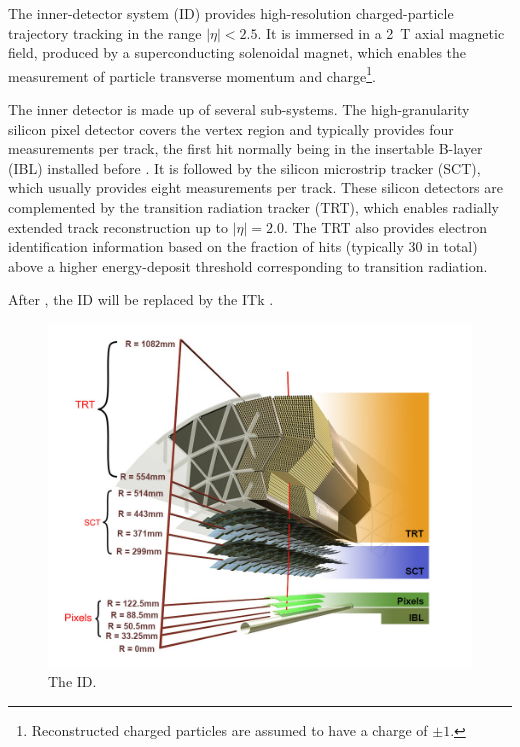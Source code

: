 The inner-detector system (ID) provides high-resolution charged-particle trajectory tracking in the range $|\eta| < 2.5$.
It is immersed in a \SI{2}{\tesla} axial magnetic field, produced by a superconducting solenoidal magnet, which enables the measurement of particle transverse momentum and charge\footnote{Reconstructed charged particles are assumed to have a charge of $\pm 1$.}.

The inner detector is made up of several sub-systems.
The high-granularity silicon pixel detector covers the vertex region and typically provides four measurements per track, 
the first hit normally being in the insertable B-layer (IBL) installed before \runtwo \cite{ATLAS-TDR-19,PIX-2018-001}.
It is followed by the silicon microstrip tracker (SCT), which usually provides eight measurements per track.
These silicon detectors are complemented by the transition radiation tracker (TRT),
which enables radially extended track reconstruction up to \(|\eta| = 2.0\). 
The TRT also provides electron identification information 
based on the fraction of hits (typically 30 in total) above a higher energy-deposit threshold corresponding to transition radiation.

After \runthree, the ID will be replaced by the ITk \cite{CERN-LHCC-2017-021}.


\begin{figure}[!htpb]
  \centering
  \includegraphics[width=0.5\linewidth]{chapters/2.detector/figs/atlas_id_xs.png}
  \caption{The \ATLAS ID.}
  \label{fig:atlas_id_run2}
\end{figure}
%

